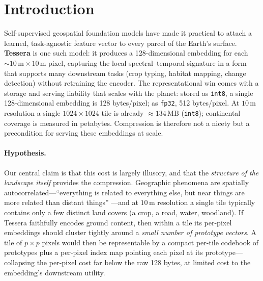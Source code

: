 \documentclass[11pt]{article}
\begin{document}
\section{Introduction}

Self-supervised geospatial foundation models have made it practical to attach a
learned, task-agnostic feature vector to every parcel of the Earth's surface.
\textbf{Tessera} is one such model: it produces a 128-dimensional embedding for
each ${\sim}10\,\mathrm{m}\times10\,\mathrm{m}$ pixel, capturing the local
spectral--temporal signature in a form that supports many downstream tasks
(crop typing, habitat mapping, change detection) without retraining the encoder.
The representational win comes with a storage and serving liability that scales
with the planet: stored as \texttt{int8}, a single 128-dimensional embedding is
128 bytes/pixel; as \texttt{fp32}, 512 bytes/pixel. At $10\,\mathrm{m}$
resolution a single $1024\times1024$ tile is already ${\approx}134\,\mathrm{MB}$
(\texttt{int8}); continental coverage is measured in petabytes. Compression is
therefore not a nicety but a precondition for serving these embeddings at scale.

\paragraph{Hypothesis.}
Our central claim is that this cost is largely illusory, and that the
\emph{structure of the landscape itself} provides the compression. Geographic
phenomena are spatially autocorrelated---``everything is related to everything
else, but near things are more related than distant things''
\cite{tobler1970}---and at $10\,\mathrm{m}$ resolution a single tile typically
contains only a few distinct land covers (a crop, a road, water, woodland).
If Tessera faithfully encodes ground content, then within a tile its
per-pixel embeddings should cluster tightly around a \emph{small number of
prototype vectors}. A tile of $p\times p$ pixels would then be representable by
a compact per-tile codebook of prototypes plus a per-pixel index map pointing
each pixel at its prototype---collapsing the per-pixel cost far below the raw
128 bytes, at limited cost to the embedding's downstream utility.
\end{document}
